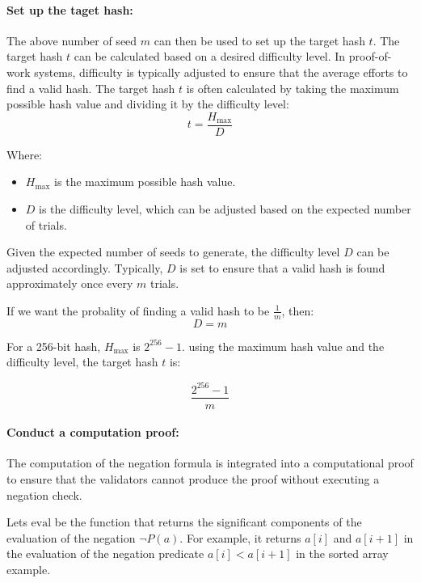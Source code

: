 \documentclass[runningheads]{llncs}
\begin{document}




\paragraph{Set up the taget hash:}
The above number of seed $m$ can then be used to set up the target hash $t$. The target hash $t$ can be calculated based on a desired difficulty level. In proof-of-work systems, difficulty is typically adjusted to ensure that the average efforts to find a valid hash. The target hash $t$ is often calculated by taking the maximum possible hash value and dividing it by the difficulty level:
\[
t = \frac{H_{\text{max}}}{D}
\]

Where:
\begin{itemize}
  \item \( H_{\text{max}} \) is the maximum possible hash value.
  \item \( D \) is the difficulty level, which can be adjusted based on the expected number of trials.
\end{itemize}


Given the expected number of seeds to generate, 
the difficulty level $D$ can be adjusted accordingly. Typically, $D$ is set to ensure that a valid hash is found approximately once every $m$ trials.

If we want the probality of finding a valid hash to be $\frac{1}{m}$, then:
\[
D=m
\]

For a 256-bit hash, $H_{\text{max}}$ is $2^{256} - 1 $.  using the maximum hash value and the difficulty level, the target hash $t$ is:
    
\[
\frac{2^{256} - 1}{m}
\]
\paragraph{Conduct a computation proof:} The computation of the negation formula is integrated into a computational proof to ensure that the validators cannot produce the proof without executing a negation check.

Lets \(\text{eval}\) be the function that returns the significant components of the evaluation of the negation \(\neg P(a)\).  For example, it returns \(a[i]\) and \(a[i + 1]\) in the evaluation of the negation predicate \(a[i] < a[i+1]\) in the sorted array example.
\end{document}
